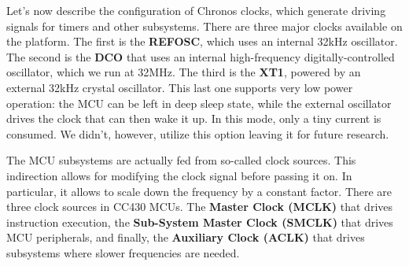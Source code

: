 Let's now describe the configuration of Chronos clocks, which generate driving signals for timers and other subsystems. There are three major clocks available on the platform. The first is the {\bf REFOSC}, which uses an internal 32kHz oscillator. The second is the {\bf DCO} that uses an internal high-frequency digitally-controlled oscillator, which we run at 32MHz. The third is the {\bf XT1}, powered by an external 32kHz crystal oscillator. This last one supports very low power operation: the MCU can be left in deep sleep state, while the external oscillator drives the clock that can then wake it up. In this mode, only a tiny current is consumed. We didn't, however, utilize this option leaving it for future research.

The MCU subsystems are actually fed from so-called clock sources. This indirection allows for modifying the clock signal before passing it on. In particular, it allows to scale down the frequency by a constant factor. There are three clock sources in CC430 MCUs. The {\bf Master Clock (MCLK)} that drives instruction execution, the {\bf Sub-System Master Clock (SMCLK)} that drives MCU peripherals, and finally, the {\bf Auxiliary Clock (ACLK)} that drives subsystems where slower frequencies are needed.

